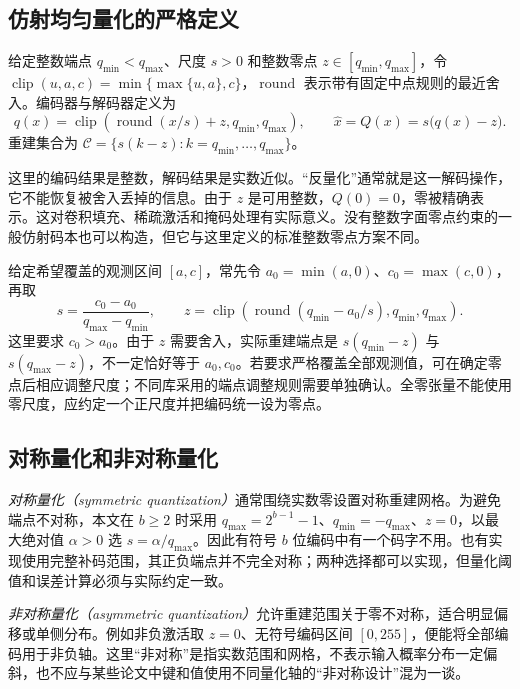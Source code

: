 \documentclass[UTF8,12pt,a4paper,fontset=fandol]{ctexart}
\begin{document}
\subsection{仿射均匀量化的严格定义}
\begin{definition}[仿射均匀量化]
给定整数端点 $q_{\min}<q_{\max}$、尺度 $s>0$ 和整数零点 $z\in[q_{\min},q_{\max}]$，令 $\operatorname{clip}(u,a,c)=\min\{\max\{u,a\},c\}$，$\operatorname{round}$ 表示带有固定中点规则的最近舍入。编码器与解码器定义为
\begin{equation}
 q(x)=\operatorname{clip}\!\left(\operatorname{round}(x/s)+z,q_{\min},q_{\max}\right),
 \qquad \widehat x=Q(x)=s\bigl(q(x)-z\bigr).
 \label{eq:quant-affine}
\end{equation}
重建集合为 $\mathcal C=\{s(k-z):k=q_{\min},\ldots,q_{\max}\}$。
\end{definition}
这里的编码结果是整数，解码结果是实数近似。“反量化”通常就是这一解码操作，它不能恢复被舍入丢掉的信息。由于 $z$ 是可用整数，$Q(0)=0$，零被精确表示。这对卷积填充、稀疏激活和掩码处理有实际意义。没有整数字面零点约束的一般仿射码本也可以构造，但它与这里定义的标准整数零点方案不同。

给定希望覆盖的观测区间 $[a,c]$，常先令 $a_0=\min(a,0)$、$c_0=\max(c,0)$，再取
\begin{equation}
 s=\frac{c_0-a_0}{q_{\max}-q_{\min}},\qquad
 z=\operatorname{clip}\!\left(\operatorname{round}(q_{\min}-a_0/s),q_{\min},q_{\max}\right).
 \label{eq:quant-minmax}
\end{equation}
这里要求 $c_0>a_0$。由于 $z$ 需要舍入，实际重建端点是 $s(q_{\min}-z)$ 与 $s(q_{\max}-z)$，不一定恰好等于 $a_0,c_0$。若要求严格覆盖全部观测值，可在确定零点后相应调整尺度；不同库采用的端点调整规则需要单独确认。全零张量不能使用零尺度，应约定一个正尺度并把编码统一设为零点。

\subsection{对称量化和非对称量化}
\emph{对称量化（symmetric quantization）}通常围绕实数零设置对称重建网格。为避免端点不对称，本文在 $b\geq2$ 时采用 $q_{\max}=2^{b-1}-1$、$q_{\min}=-q_{\max}$、$z=0$，以最大绝对值 $\alpha>0$ 选 $s=\alpha/q_{\max}$。因此有符号 $b$ 位编码中有一个码字不用。也有实现使用完整补码范围，其正负端点并不完全对称；两种选择都可以实现，但量化阈值和误差计算必须与实际约定一致。

\emph{非对称量化（asymmetric quantization）}允许重建范围关于零不对称，适合明显偏移或单侧分布。例如非负激活取 $z=0$、无符号编码区间 $[0,255]$，便能将全部编码用于非负轴。这里“非对称”是指实数范围和网格，不表示输入概率分布一定偏斜，也不应与某些论文中键和值使用不同量化轴的“非对称设计”混为一谈。
\end{document}
